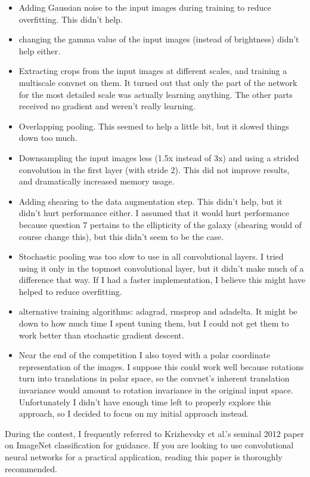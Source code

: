 \documentclass[a4paper,10pt]{article}
\begin{document}
\begin{itemize}
 \item Adding Gaussian noise to the input images during training to reduce overfitting. This didn't help.
 \item changing the gamma value of the input images (instead of brightness) didn't help either.
 \item Extracting crops from the input images at different scales, and training a multiscale convnet on them. It turned out that only the part of the network for the most detailed scale was actually learning anything. The other parts received no gradient and weren't really learning.
 \item Overlapping pooling. This seemed to help a little bit, but it slowed things down too much.
 \item Downsampling the input images less (1.5x instead of 3x) and using a strided convolution in the first layer (with stride 2). This did not improve results, and dramatically increased memory usage.
 \item Adding shearing to the data augmentation step. This didn't help, but it didn't hurt performance either. I assumed that it would hurt performance because question 7 pertains to the ellipticity of the galaxy (shearing would of course change this), but this didn't seem to be the case.
 \item Stochastic pooling \cite{zeiler2013stochastic} was too slow to use in all convolutional layers. I tried using it only in the topmost convolutional layer, but it didn't make much of a difference that way. If I had a faster implementation, I believe this might have helped to reduce overfitting.
 \item alternative training algorithms: adagrad\cite{journals/jmlr/DuchiHS11}, rmsprop and adadelta\cite{zeiler2012adadelta}. It might be down to how much time I spent tuning them, but I could not get them to work better than stochastic gradient descent.
 \item Near the end of the competition I also toyed with a polar coordinate representation of the images. I suppose this could work well because rotations turn into translations in polar space, so the convnet's inherent translation invariance would amount to rotation invariance in the original input space. Unfortunately I didn't have enough time left to properly explore this approach, so I decided to focus on my initial approach instead. 
\end{itemize}

During the contest, I frequently referred to Krizhevsky et al.'s seminal 2012 paper on ImageNet classification \cite{Krizhevsky2012} for guidance. If you are looking to use convolutional neural networks for a practical application, reading this paper is thoroughly recommended.



\end{document}
